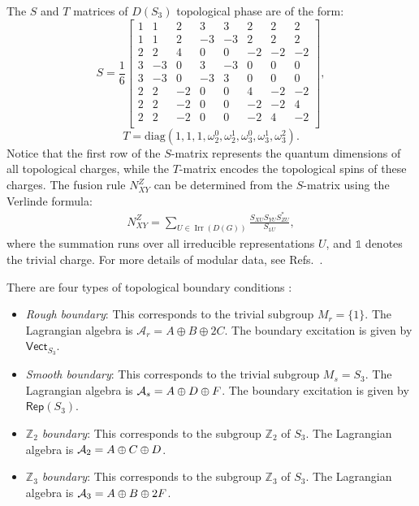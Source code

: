 \documentclass[a4paper,11pt]{article}
\theoremstyle{theorem}
\theoremstyle{remark}
\newcommand{\Zbb}{\mathbb{Z}}
\newcommand{\Rep}{\mathsf{Rep}}
\newcommand{\Irr}{\operatorname{Irr}}
\newcommand{\Vect}{\mathsf{Vect}}
\newcommand{\cA}{\text{\usefont{OMS}{cmsy}{m}{n}A}}
\begin{document}
The $S$ and $T$ matrices of $D(S_3)$ topological phase are of the form:
\begin{equation}
\label{eq:ds3-S}
S = \frac{1}{6}
\begin{bmatrix}
1 & 1 & 2 & 3 & 3 & 2 & 2 & 2 \\
1 & 1 & 2 & -3 & -3 & 2 & 2 & 2 \\
2 & 2 & 4 & 0 & 0 & -2 & -2 & -2 \\
3 & -3 & 0 & 3 & -3 & 0 & 0 & 0 \\
3 & -3 & 0 & -3 & 3 & 0 & 0 & 0 \\
2 & 2 & -2 & 0 & 0 & 4 & -2 & -2 \\
2 & 2 & -2 & 0 & 0 & -2 & -2 & 4 \\
2 & 2 & -2 & 0 & 0 & -2 & 4 & -2 \\
\end{bmatrix},
\end{equation}
\begin{equation}
\label{eq:ds3-T}
{T} = \text{diag}(1,1,1,\omega_2^0,\omega_2^1,\omega_3^0,\omega_3^1,\omega_3^2).
\end{equation}
Notice that the first row of the \( S \)-matrix represents the quantum dimensions of all topological charges, while the \( T \)-matrix encodes the topological spins of these charges. The fusion rule \( N_{XY}^Z \) can be determined from the \( S \)-matrix using the Verlinde formula:  
\begin{align}\label{eq:verlinde}
    N_{XY}^{Z} = \sum_{U \in \Irr (D(G))} \frac{S_{XU} S_{YU} S_{ZU}^{\ast}}{S_{\mathbb{1}U}},
\end{align}  
where the summation runs over all irreducible representations \( U \), and \( \mathbb{1} \) denotes the trivial charge.
For more details of modular data, see Refs.~\cite{bakalov2001lectures,wang2010topological,etingof2016tensor}.

There are four types of topological boundary conditions \cite{Cong2017}:
\begin{itemize}
    \item \emph{Rough boundary}: This corresponds to the trivial subgroup \( M_r = \{1\} \). The Lagrangian algebra is \( \mathcal{A}_r = A \oplus B \oplus 2C \). The boundary excitation is given by \( \Vect_{S_3} \).
    \item \emph{Smooth boundary}: This corresponds to the trivial subgroup \( M_s = S_3 \). The Lagrangian algebra is \( \cA_s = A \oplus D \oplus F \). The boundary excitation is given by \( \Rep(S_3) \).
    \item \emph{\( \Zbb_2 \) boundary}: This corresponds to the subgroup \( \Zbb_2 \) of \( S_3 \). The Lagrangian algebra is \( \cA_2 = A \oplus C \oplus D \).
    \item \emph{\( \Zbb_3 \) boundary}: This corresponds to the subgroup \( \Zbb_3 \) of \( S_3 \). The Lagrangian algebra is \( \cA_3 = A \oplus B \oplus 2F \).
\end{itemize}
\end{document}
